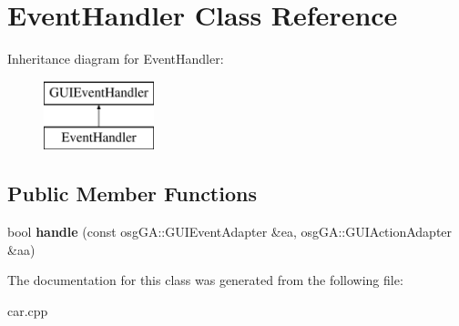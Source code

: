 \hypertarget{classEventHandler}{}\section{Event\+Handler Class Reference}
\label{classEventHandler}
Inheritance diagram for Event\+Handler\+:\begin{figure}[H]
\begin{center}
\leavevmode
\includegraphics[height=2.000000cm]{classEventHandler}
\end{center}
\end{figure}
\subsection*{Public Member Functions}
\begin{DoxyCompactItemize}
\item 
\mbox{\label{classEventHandler_af28f371276fd76929be0a31fbb1be88a}} 
bool {\bfseries handle} (const osg\+G\+A\+::\+G\+U\+I\+Event\+Adapter \&ea, osg\+G\+A\+::\+G\+U\+I\+Action\+Adapter \&aa)
\end{DoxyCompactItemize}


The documentation for this class was generated from the following file\+:\begin{DoxyCompactItemize}
\item 
car.\+cpp\end{DoxyCompactItemize}
